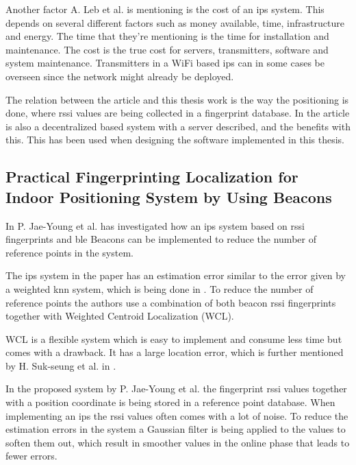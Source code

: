 \bigskip

Another factor A. Leb et al. is mentioning is the cost of an \acrshort{ips} system.
This depends on several different factors such as money available, time, infrastructure and energy.
The time that they're mentioning is the time for installation and maintenance.
The cost is the true cost for servers, transmitters, software and system maintenance.
Transmitters in a WiFi based \acrshort{ips} can in some cases be overseen since the network might already be deployed.

\bigskip

The relation between the article and this thesis work is the way the positioning is done, where \acrshort{rssi} values are being collected in a fingerprint database.
In the article is also a decentralized based system with a server described, and the benefits with this.
This has been used when designing the software implemented in this thesis.


\subsection{Practical Fingerprinting Localization for Indoor Positioning System by Using Beacons}\label{sec:}
In \cite{PracticalFingerprintingLocalization2017} P. Jae-Young et al. has investigated how an \acrshort{ips} system based on \acrshort{rssi} fingerprints and \acrshort{ble} Beacons can be implemented to reduce the number of reference points in the system.

\bigskip

The \acrshort{ips} system in the paper has an estimation error similar to the  error given by a weighted \acrshort{knn} system, which is being done in \cite{ImprovingIndoorLocalization2016}.
To reduce the number of reference points the authors use a combination of both beacon \acrshort{rssi} fingerprints together with Weighted Centroid Localization (WCL). 

\bigskip

WCL is a flexible system which is easy to implement and consume less time but comes with a drawback. 
It has a large location error, which is further mentioned by H. Suk-seung et al. in \cite{BeaconBasedIndoor2016}.

\bigskip

In the proposed system by P. Jae-Young et al. the fingerprint \acrshort{rssi} values together with a position coordinate is being stored in a reference point database.
When implementing an \acrshort{ips} the \acrshort{rssi} values often comes with a lot of noise.
To reduce the estimation errors in the system a Gaussian filter is being applied to the values to soften them out, which result in smoother values in the online phase that leads to fewer errors.  

